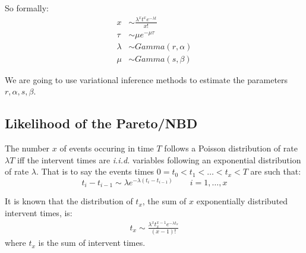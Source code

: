 \documentclass{tufte-book}
\begin{document}
So formally:
\begin{align*}
x & \sim \frac{\lambda^x t^x e^{-\lambda t}}{x !} \\
\tau & \sim \mu e^{-\mu \tau} \\
\lambda & \sim Gamma(r,\alpha) \\
\mu & \sim Gamma(s, \beta)
\end{align*}

We are going to use variational inference methods to estimate the
parameters $r,\alpha, s, \beta$.

\subsection{Likelihood of the Pareto/NBD}
\label{sub:likelihood_of_the_pareto_nbd}

The number $x$ of events occuring in time $T$ follows a Poisson
distribution of rate $\lambda T$ iff the intervent times are
\emph{i.i.d.}  variables following an exponential distribution of rate
$\lambda$. That is to say the events times $0=t_0 < t_1 < \ldots < t_x
<T$ are such that:
$$t_i - t_{i-1} \sim \lambda e^{-\lambda (t_i - t_{i-1})} \qquad
i=1,\ldots,x $$

It is known that the distribution of $t_x$, the sum of $x$
exponentially distributed intervent times, is:
\begin{align*}
  t_x \sim \frac{\lambda^x t_x^{x-1} e^{-\lambda t_x}}{(x-1)!}
\end{align*}
where $t_x$ is the sum of intervent times.
\end{document}
